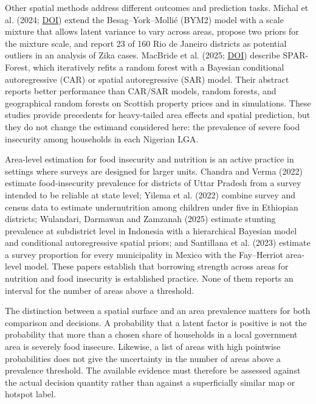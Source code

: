 Other spatial methods address different outcomes and prediction tasks. Michal et al. (2024; \href{https://doi.org/10.1177/09622802241293776}{DOI}) extend the Besag--York--Mollié (BYM2) model with a scale mixture that allows latent variance to vary across areas, propose two priors for the mixture scale, and report 23 of 160 Rio de Janeiro districts as potential outliers in an analysis of Zika cases. MacBride et al. (2025; \href{https://doi.org/10.1214/24-aoas1969}{DOI}) describe SPAR-Forest, which iteratively refits a random forest with a Bayesian conditional autoregressive (CAR) or spatial autoregressive (SAR) model. Their abstract reports better performance than CAR/SAR models, random forests, and geographical random forests on Scottish property prices and in simulations. These studies provide precedents for heavy-tailed area effects and spatial prediction, but they do not change the estimand considered here: the prevalence of severe food insecurity among households in each Nigerian LGA.

Area-level estimation for food insecurity and nutrition is an active practice in settings where surveys are designed for larger units. Chandra and Verma (2022) estimate food-insecurity prevalence for districts of Uttar Pradesh from a survey intended to be reliable at state level; Yilema et al. (2022) combine survey and census data to estimate undernutrition among children under five in Ethiopian districts; Wulandari, Darmawan and Zamzanah (2025) estimate stunting prevalence at subdistrict level in Indonesia with a hierarchical Bayesian model and conditional autoregressive spatial priors; and Santillana et al. (2023) estimate a survey proportion for every municipality in Mexico with the Fay--Herriot area-level model. These papers establish that borrowing strength across areas for nutrition and food insecurity is established practice. None of them reports an interval for the number of areas above a threshold.

The distinction between a spatial surface and an area prevalence matters for both comparison and decisions. A probability that a latent factor is positive is not the probability that more than a chosen share of households in a local government area is severely food insecure. Likewise, a list of areas with high pointwise probabilities does not give the uncertainty in the number of areas above a prevalence threshold. The available evidence must therefore be assessed against the actual decision quantity rather than against a superficially similar map or hotspot label.

